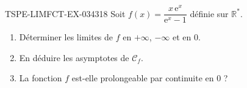 \begin{exercice}{TSPE-LIMFCT-EX-034}{3}{18}
Soit $f(x) = \dfrac{x\,\mathrm{e}^x}{\mathrm{e}^x - 1}$ définie sur $\mathbb{R}^*$.
\begin{enumerate}
  \item Déterminer les limites de $f$ en $+\infty$, $-\infty$ et en $0$.
  \item En déduire les asymptotes de $\mathcal{C}_f$.
  \item La fonction $f$ est-elle prolongeable par continuite en $0$ ?
\end{enumerate}
\end{exercice}

